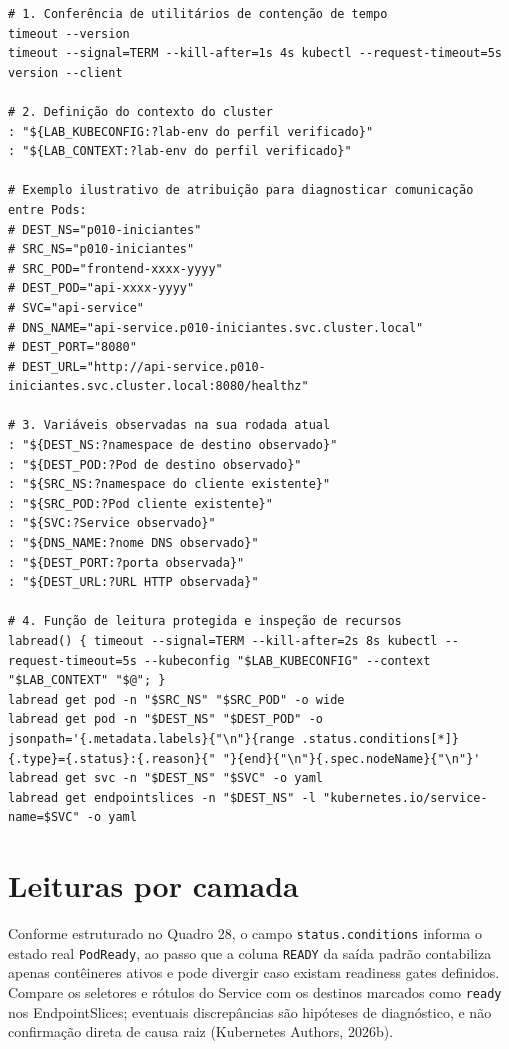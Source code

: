 \documentclass[12pt,openany,oneside,a4paper,chapter=TITLE,english,brazil]{abntex2}
\begin{document}
\begin{apendicesenv}
\begin{verbatim}
# 1. Conferência de utilitários de contenção de tempo
timeout --version
timeout --signal=TERM --kill-after=1s 4s kubectl --request-timeout=5s version --client

# 2. Definição do contexto do cluster
: "${LAB_KUBECONFIG:?lab-env do perfil verificado}"
: "${LAB_CONTEXT:?lab-env do perfil verificado}"

# Exemplo ilustrativo de atribuição para diagnosticar comunicação entre Pods:
# DEST_NS="p010-iniciantes"
# SRC_NS="p010-iniciantes"
# SRC_POD="frontend-xxxx-yyyy"
# DEST_POD="api-xxxx-yyyy"
# SVC="api-service"
# DNS_NAME="api-service.p010-iniciantes.svc.cluster.local"
# DEST_PORT="8080"
# DEST_URL="http://api-service.p010-iniciantes.svc.cluster.local:8080/healthz"

# 3. Variáveis observadas na sua rodada atual
: "${DEST_NS:?namespace de destino observado}"
: "${DEST_POD:?Pod de destino observado}"
: "${SRC_NS:?namespace do cliente existente}"
: "${SRC_POD:?Pod cliente existente}"
: "${SVC:?Service observado}"
: "${DNS_NAME:?nome DNS observado}"
: "${DEST_PORT:?porta observada}"
: "${DEST_URL:?URL HTTP observada}"

# 4. Função de leitura protegida e inspeção de recursos
labread() { timeout --signal=TERM --kill-after=2s 8s kubectl --request-timeout=5s --kubeconfig "$LAB_KUBECONFIG" --context "$LAB_CONTEXT" "$@"; }
labread get pod -n "$SRC_NS" "$SRC_POD" -o wide
labread get pod -n "$DEST_NS" "$DEST_POD" -o jsonpath='{.metadata.labels}{"\n"}{range .status.conditions[*]}{.type}={.status}:{.reason}{" "}{end}{"\n"}{.spec.nodeName}{"\n"}'
labread get svc -n "$DEST_NS" "$SVC" -o yaml
labread get endpointslices -n "$DEST_NS" -l "kubernetes.io/service-name=$SVC" -o yaml
\end{verbatim}

\section*{Leituras por camada}\label{leituras-por-camada}

Conforme estruturado no Quadro 28, o campo \texttt{status.\allowbreak{}conditions} informa o estado real \texttt{Pod\allowbreak{}Ready}, ao passo que a coluna \texttt{READY} da saída padrão contabiliza apenas contêineres ativos e pode divergir caso existam readiness gates definidos. Compare os seletores e rótulos do Service com os destinos marcados como \texttt{ready} nos EndpointSlices; eventuais discrepâncias são hipóteses de diagnóstico, e não confirmação direta de causa raiz (Kubernetes Authors, 2026b).


\end{apendicesenv}
\end{document}
